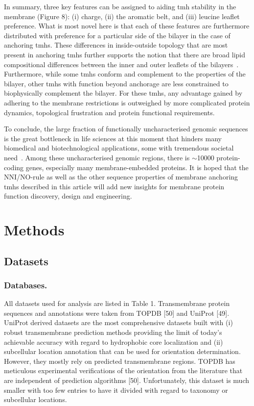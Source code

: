 In summary, three key features can be assigned to aiding \gls{tmh} stability in the membrane (Figure 8): (i) charge, (ii) the aromatic belt, and (iii) leucine leaflet preference. What is most novel here is that each of these features are furthermore distributed with preference for a particular side of the bilayer in the case of anchoring \gls{tmh}s. These differences in inside-outside topology that are most present in anchoring \gls{tmh}s further supports the notion that there are broad lipid compositional differences between the inner and outer leaflets of the bilayers~\cite{Sharpe2010}. Furthermore, while some \gls{tmh}s conform and complement to the properties of the bilayer, other \gls{tmh}s with function beyond anchorage are less constrained to biophysically complement the bilayer. For these \gls{tmh}s, any advantage gained by adhering to the membrane restrictions is outweighed by more complicated protein dynamics, topological frustration and protein functional requirements.

To conclude, the large fraction of functionally uncharacterised genomic sequences is the great bottleneck in life sciences at this moment that hinders many biomedical and biotechnological applications, some with tremendous societal need~\cite{Eisenhaber2012,Kuznetsov2013}. Among these uncharacterised genomic regions, there is \(\sim\)10000 protein-coding genes, especially many membrane-embedded proteins. It is hoped that the NNI/NO-rule as well as the other sequence properties of membrane anchoring \gls{tmh}s described in this article will add new insights for membrane protein function discovery, design and engineering.

\section{Methods}

\subsection{Datasets}
\subsubsection{Databases.}
All datasets used for analysis are listed in Table 1. Transmembrane protein sequences and annotations were taken from TOPDB [50] and UniProt [49]. UniProt derived datasets are the most comprehensive datasets built with (i) robust transmembrane prediction methods providing the limit of today’s achievable accuracy with regard to hydrophobic core localization and (ii) subcellular location annotation that can be used for orientation determination. However, they mostly rely on predicted transmembrane regions. TOPDB has meticulous experimental verifications of the orientation from the literature that are independent of prediction algorithms [50]. Unfortunately, this dataset is much smaller with too few entries to have it divided with regard to taxonomy or subcellular locations.

